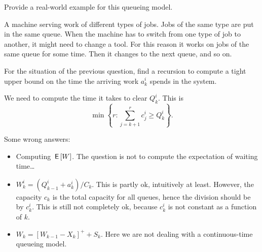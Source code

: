 \begin{exercise}[201704]
  Provide a real-world example for this queueing model.
  \begin{solution}
A machine serving work of different types of jobs. Jobs of the same type are put in the same queue. When the machine has to switch from one type of job to another, it might need to change a tool. For this reason it works on jobs of the same queue for some time. Then it changes to the next queue, and so on. 
  \end{solution}
\end{exercise}

\begin{exercise}[201704]{2} For the situation of the previous question, find a recursion to compute a tight upper bound on the time the arriving work $a_k^i$ spends in the system.
  \begin{solution}
We need to compute the time it takes to clear $Q_k^i$. This is
\begin{equation*}
  \min\left\{r: \sum_{j=k+1}^r c_j^i \geq Q_k^i\right\}.
\end{equation*}

Some wrong answers:
\begin{itemize}
\item Computing $\,\mathsf{E}\left[W\right]$. The question is not to compute the expectation of waiting time\ldots
\item $W_k^i=(Q_{k-1}^i+a_k^i)/C_k$. This is partly ok, intuitively at least. However, the capacity $c_k$ is the total capacity for all queues, hence the division should be by $c_k^i$. This is still not completely ok, because $c_k^i$ is not constant as a function of $k$.
\item $W_k = [W_{k-1}-X_k]^+ + S_k$. Here we are not dealing with a continuous-time queueing model. 
\end{itemize}
  \end{solution}
\end{exercise}


